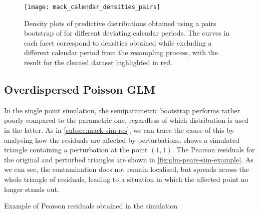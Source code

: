 \documentclass[a4paper]{book}
\begin{document}
\begin{landscape}
  \begin{figure}
    \centering
    \texttt{[image: mack\_calendar\_densities\_pairs]}
    \caption[Calendar outlier density plots for Mack's model, pairs bootstrap]{Density plots of predictive distributions obtained using a pairs bootstrap of  for different deviating calendar periods. The curves in each facet correspond to densities obtained while excluding a different calendar period from the resampling process, with the result for the cleaned dataset highlighted in red.}
    \label{fig:mack-calendar-pairs}
  \end{figure}
\end{landscape}

\subsection{Overdispersed Poisson GLM}

In the single point simulation, the semiparametric bootstrap performs rather poorly compared to the parametric one, regardless of which distribution is used in the latter. As in \cref{subsec:mack-sim-res}, we can trace the cause of this by analysing how the residuals are affected by perturbations.  shows a simulated triangle containing a perturbation at the point $(1, 1)$. The Pearson residuals for the original and perturbed triangles are shown in \cref{fig:glm-pears-sim-example}. As we can see, the contamination does not remain localised, but spreads across the whole triangle of residuals, leading to a situation in which the affected point no longer stands out.



\begin{table}[!htb]
  \begin{subtable}{\linewidth}
    
  \end{subtable}
  \newline
  \vspace*{0.25cm}
  \newline
  \begin{subtable}{\linewidth}
    
  \end{subtable}
  \caption{Example of Pearson residuals obtained in the simulation}
  \label{fig:glm-pears-sim-example}
\end{table}
\end{document}
